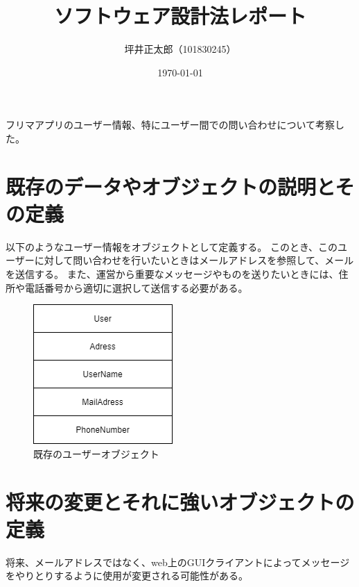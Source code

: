 \documentclass[a4paper,10pt]{jsarticle}
\begin{document}
\title{ソフトウェア設計法レポート}
\author{坪井正太郎（101830245）}
\date{\today}
\maketitle
フリマアプリのユーザー情報、特にユーザー間での問い合わせについて考察した。
\section{既存のデータやオブジェクトの説明とその定義}
以下のようなユーザー情報をオブジェクトとして定義する。
このとき、このユーザーに対して問い合わせを行いたいときはメールアドレスを参照して、メールを送信する。
また、運営から重要なメッセージやものを送りたいときには、住所や電話番号から適切に選択して送信する必要がある。
\begin{figure}[H]
  \centering
  \includegraphics[width=\linewidth]{./01.drawio.png}
  \caption{既存のユーザーオブジェクト}
  \label{}
\end{figure}

\section{将来の変更とそれに強いオブジェクトの定義}
将来、メールアドレスではなく、web上のGUIクライアントによってメッセージをやりとりするように使用が変更される可能性がある。
\end{document}
